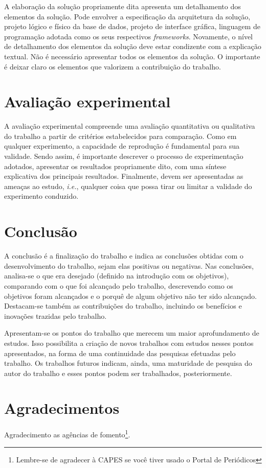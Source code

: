 \documentclass[12pt]{article}
\begin{document}
	A elaboração da solução propriamente dita apresenta um detalhamento dos elementos da solução. Pode envolver a especificação da arquitetura da solução, projeto lógico e físico da base de dados, projeto de interface gráfica, linguagem de programação adotada como os seus respectivos \emph{frameworks}. Novamente, o nível de detalhamento dos elementos da solução deve estar condizente com a explicação textual. Não é necessário apresentar todos os elementos da solução. O importante é deixar claro os elementos que valorizem a contribuição do trabalho.
	
	\section{Avaliação experimental}
	\label{sec:aval_exp}
	
	A avaliação experimental compreende uma avaliação quantitativa ou qualitativa do trabalho a partir de critérios estabelecidos para comparação. Como em qualquer experimento, a capacidade de reprodução é fundamental para sua validade. Sendo assim, é importante descrever o processo de experimentação adotados, apresentar os resultados propriamente dito, com uma síntese explicativa dos principais resultados. Finalmente, devem ser apresentadas as ameaças ao estudo, \emph{i.e.}, qualquer coisa que possa tirar ou limitar a validade do experimento conduzido. 
	
	\section{Conclusão}
	\label{sec:conclusao}
	
	A conclusão é a finalização do trabalho e indica as conclusões obtidas com o desenvolvimento do trabalho, sejam elas positivas ou negativas. Nas conclusões, analisa-se o que era desejado (definido na introdução com os objetivos), comparando com o que foi alcançado pelo trabalho, descrevendo como os objetivos foram alcançados e o porquê de algum objetivo não ter sido alcançado. Destacam-se também as contribuições do trabalho, incluindo os benefícios e inovações trazidas pelo trabalho.
	
	Apresentam-se os pontos do trabalho que merecem um maior aprofundamento de estudos. Isso possibilita a criação de novos trabalhos com estudos nesses pontos apresentados, na forma de uma continuidade das pesquisas efetuadas pelo trabalho. Os trabalhos futuros indicam, ainda, uma maturidade de pesquisa do autor do trabalho e esses pontos podem ser trabalhados, posteriormente.
	
	\section*{Agradecimentos}
	Agradecimento as agências de fomento\footnote{Lembre-se de agradecer à CAPES se você tiver usado o Portal de Periódicos}.
	
	
	
	
\end{document}
